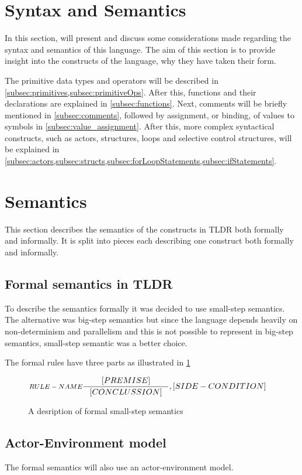 \section{Syntax and Semantics}
\label{sec:syntax}
In this section, will present and discuss some considerations made regarding the syntax and semantics of this language. The aim of this section is to provide insight into the constructs of the language, why they have taken their form.

The primitive data types and operators will be described in \cref{subsec:primitives,subsec:primitiveOps}. After this, functions and their declarations are explained in \cref{subsec:functions}. Next, comments will be briefly mentioned in \cref{subsec:comments}, followed by assignment, or binding, of values to symbols in \cref{subsec:value_assignment}. After this, more complex syntactical constructs, such as actors, structures, loops and selective control structures, will be explained in \cref{subsec:actors,subsec:structs,subsec:forLoopStatements,subsec:ifStatements}.

\section{Semantics}\label{semantics}
This section describes the semantics of the constructs in TLDR both formally and informally. It is split into pieces each describing one construct both formally and informally.

\subsection{Formal semantics in TLDR}
To describe the semantics formally it was decided to use small-step semantics. The alternative was big-step semantics but since the language depends heavily on non-determinism and parallelism and this is not possible to represent in big-step semantics, small-step semantic was a better choice.

The formal rules have three parts as illustrated in \cref{SS-semantics}

\begin{figure}[H]
\begin{align*}
&\inference[$RULE-NAME$]{[PREMISE]}
												{[CONCLUSSION]}
												{,[SIDE-CONDITION]}
\end{align*}
\caption{A desription of formal small-step semantics}
\label{SS-semantics}
\end{figure}

\subsection{Actor-Environment model}
The formal semantics will also use an actor-environment model.

